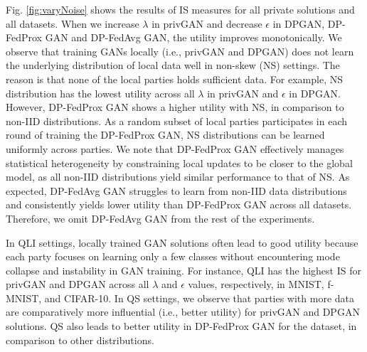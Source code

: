 \documentclass[conference]{IEEEtran}
\begin{document}
Fig. \ref{fig:varyNoise} shows the results of IS measures for all private solutions and all datasets. When we increase $\lambda$ in  privGAN and decrease $\epsilon$ in DPGAN, DP-FedProx GAN and DP-FedAvg GAN, the utility improves monotonically. 
 We observe that training GANs locally (i.e., privGAN and DPGAN) does not learn the underlying distribution of local data well in non-skew (NS) settings. The reason is that none of the local parties holds sufficient data. For example, NS distribution has the lowest utility across all $\lambda$ in privGAN and $\epsilon$ in DPGAN. However, DP-FedProx GAN shows a higher utility with NS, in comparison to non-IID distributions.  As a random subset of local parties participates in each round of training the DP-FedProx GAN, NS distributions can be learned uniformly across parties.  We note that DP-FedProx GAN effectively manages statistical heterogeneity by constraining local updates to be closer to the global model,  as all non-IID distributions yield similar performance to that of NS. {As expected, DP-FedAvg GAN struggles to learn from non-IID data distributions and consistently yields lower utility than DP-FedProx GAN across all datasets. Therefore, we omit DP-FedAvg GAN from the rest of the experiments.}
 
In QLI settings, locally trained GAN solutions often lead to good utility because each party focuses on learning only a few classes without encountering mode collapse and instability in GAN training. For instance, QLI has the highest IS for privGAN and DPGAN across all $\lambda$ and $\epsilon$ values, respectively, in MNIST, f-MNIST, and CIFAR-10.  In QS settings, we observe that parties with more data are comparatively more influential (i.e., better utility) for privGAN and DPGAN solutions. QS also leads to better utility in DP-FedProx GAN for the dataset, in comparison to other distributions.   %
\end{document}
